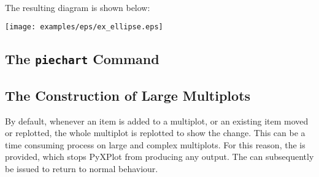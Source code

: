 {{\newline
{}\newline
{}\newline
{}\newline
}\\{\footnotesize
{}\newline
{}\newline
{}\newline
{}\newline
{}\newline
{}\newline
{}\newline
}\\{\footnotesize
{}\newline
{}\newline
}
\vspace{2mm}\\

The resulting diagram is shown below:

\centerline{\texttt{[image: examples/eps/ex\_ellipse.eps]}}
}

\subsection{The {\tt piechart} Command}
\label{sec:piechart}

\subsection{The Construction of Large Multiplots}
\label{sec:set_display}

By default, whenever an item is added to a multiplot, or an existing item moved
or replotted, the whole multiplot is replotted to show the change. This can be
a time consuming process on large and complex multiplots. For this reason, the
 is provided, which stops PyXPlot from producing any
output. The  can subsequently be issued to return to
normal behaviour.

